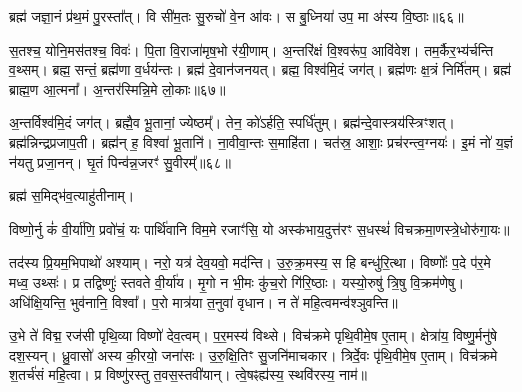 ब्रह्म॑ जज्ञा॒नं प्र॑थ॒मं पु॒रस्ता᳚त्।
वि सी॑म॒तः सु॒रुचो॑ वे॒न आ॑वः।
स बु॒ध्निया॑ उप॒ मा अ॑स्य वि॒ष्ठाः॥६६॥

स॒तश्च॒ योनि॒मस॑तश्च॒ विवः॑।
पि॒ता वि॒राजा॑मृष॒भो र॑यी॒णाम्।
अ॒न्तरि॑क्षं वि॒श्वरू॑प॒ आवि॑वेश।
तम॒र्कैर॒भ्य॑र्चन्ति व॒थ्सम्।
ब्रह्म॒ सन्तं॒ ब्रह्म॑णा व॒र्धय॑न्तः।
ब्रह्म॑ दे॒वान॑जनयत्।
ब्रह्म॒ विश्व॑मि॒दं जग॑त्।
ब्रह्म॑णः क्ष॒त्रं निर्मि॑तम्।
ब्रह्म॑ ब्राह्म॒ण आ॒त्मना᳚।
अ॒न्तर॑स्मिन्नि॒मे लो॒काः॥६७॥

अ॒न्तर्विश्व॑मि॒दं जग॑त्।
ब्रह्मै॒व भू॒तानां॒ ज्येष्ठम्᳚।
तेन॒ को॑\-ऽर्\mbox{}हति॒ स्पर्धि॑तुम्।
ब्रह्म॑न्दे॒वास्त्रय॑स्त्रिꣳशत्।
ब्रह्म॑न्निन्द्रप्रजाप॒ती।
ब्रह्म॑न् ह॒ विश्वा॑ भू॒तानि॑।
ना॒वीवा॒न्तः स॒माहि॑ता।
चत॑स्र॒ आशाः॒ प्रच॑रन्त्व॒ग्नयः॑।
इ॒मं नो॑ य॒ज्ञं न॑यतु प्रजा॒नन्।
घृ॒तं पिन्व॑न्न॒जरꣳ॑ सु॒वीरम्᳚॥६८॥

ब्रह्म॑ स॒मिद्भ॑व॒त्याहु॑तीनाम्।





विष्णो॒र्नु कं॑ वी॒र्या॑णि॒ प्रवो॑चं॒ यः पार्थि॑वानि विम॒मे रजाꣳ॑सि॒ यो अस्क॑भाय॒दुत्त॑रꣳ स॒धस्थं॑ विचक्रमा॒णस्त्रे॒धोरु॑गा॒यः॥ 

तद॑स्य प्रि॒यम॒भिपाथो॑ अश्याम्। नरो॒ यत्र॑ देव॒यवो॒ मद॑न्ति। उ॒रु॒क्र॒मस्य॒ स हि बन्धु॑रि॒त्था। विष्णोः᳚ प॒दे प॑र॒मे मध्व॒ उथ्सः॑। प्र तद्विष्णुः॑  स्तवते वी॒र्या॑य। मृ॒गो न भी॒मः कु॑च॒रो गि॑रि॒ष्ठाः। यस्यो॒रुषु॑ त्रि॒षु वि॒क्रम॑णेषु। अधि॑क्षि॒यन्ति॒ भुव॑नानि॒ विश्वा᳚। प॒रो मात्र॑या त॒नुवा॑ वृधान। न ते॑ महि॒त्वमन्व॑श्ञुवन्ति॥ 

उ॒भे ते॑ विद्म॒ रज॑सी पृथि॒व्या विष्णो॑ देव॒त्वम्। प॒र॒मस्य॑ विथ्से। विच॑क्रमे पृथि॒वीमे॒ष ए॒ताम्। क्षेत्रा॑य॒ विष्णु॒र्मनु॑षे दश॒स्यन्। ध्रु॒वासो॑ अस्य की॒रयो॒ जना॑सः। उ॒रु॒क्षि॒तिꣳ सु॒जनि॑माचकार। त्रिर्दे॒वः पृ॑थि॒वीमे॒ष ए॒ताम्। विच॑क्रमे श॒तर्च॑सं महि॒त्वा। प्र विष्णु॑रस्तु त॒वस॒स्तवी॑यान्। त्वे॒षꣴह्य॑स्य॒ स्थवि॑रस्य॒ नाम॑॥ 



